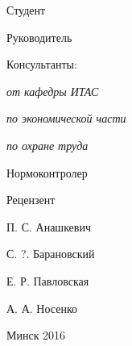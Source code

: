 \begin{minipage}{.6\textwidth}
Студент

Руководитель

Консультанты:

\hspace{0.3em} \textit{от кафедры ИТАС}

\hspace{0.3em} \textit{по экономической части}

\hspace{0.3em} \textit{по охране труда}

Нормоконтролер

\smallskip
Рецензент
\end{minipage}
\hfill
\begin{minipage}{.3\textwidth}
  П. С. Анашкевич

  С. ?. Барановский

  \vspace{\baselineskip}
  Е. Р. Павловская

  А. А. Носенко

  \color{red}{???}

  \color{black}{Е. В. Протченко}

  \smallskip
  \color{red}{???}
\end{minipage}

\vfill

{\centering{}
  Минск 2016\par
}

\setlength{\parindent}{1.25cm} %
